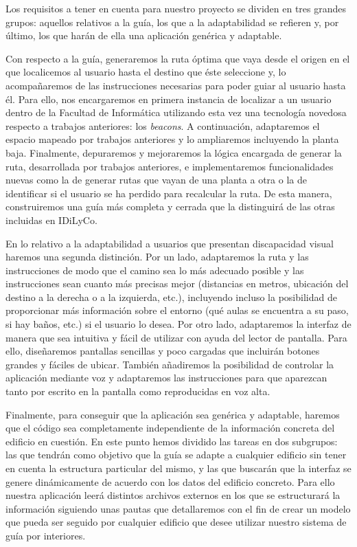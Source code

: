 Los requisitos a tener en cuenta para nuestro proyecto se dividen en tres grandes grupos: aquellos relativos a la guía, los que a la adaptabilidad se refieren y, por último, los que harán de ella una aplicación genérica y adaptable.

Con respecto a la guía, generaremos la ruta óptima que vaya desde el origen en el que localicemos al usuario hasta el destino que éste seleccione y, lo acompañaremos de las instrucciones necesarias para poder guiar al usuario hasta él. Para ello, nos encargaremos en primera instancia de localizar a un usuario dentro de la Facultad de Informática utilizando esta vez una tecnología novedosa respecto a trabajos anteriores: los \textit{beacons}. A continuación, adaptaremos el espacio mapeado por trabajos anteriores y lo ampliaremos incluyendo la planta baja. Finalmente, depuraremos y mejoraremos la lógica encargada de generar la ruta, desarrollada por trabajos anteriores, e implementaremos funcionalidades nuevas como la de generar rutas que vayan de una planta a otra o la de identificar si el usuario se ha perdido para recalcular la ruta. De esta manera, construiremos una guía más completa y cerrada que la distinguirá de las otras incluidas en IDiLyCo.

En lo relativo a la adaptabilidad a usuarios que presentan discapacidad visual haremos una segunda distinción. Por un lado, adaptaremos la ruta y las instrucciones de modo que el camino sea lo más adecuado posible y las instrucciones sean cuanto más precisas mejor (distancias en metros, ubicación del destino a la derecha o a la izquierda, etc.), incluyendo incluso la posibilidad de proporcionar más información sobre el entorno (qué aulas se encuentra a su paso, si hay baños, etc.) si el usuario lo desea. Por otro lado, adaptaremos la interfaz de manera que sea intuitiva y fácil de utilizar con ayuda del lector de pantalla. Para ello, diseñaremos pantallas sencillas y poco cargadas que incluirán botones grandes y fáciles de ubicar. También añadiremos la posibilidad de controlar la aplicación mediante voz y adaptaremos las instrucciones para que aparezcan tanto por escrito en la pantalla como reproducidas en voz alta.

Finalmente, para conseguir que la aplicación sea genérica y adaptable, haremos que el código sea completamente independiente de la información concreta del edificio en cuestión. En este punto hemos dividido las tareas en dos subgrupos: las que tendrán como objetivo que la guía se adapte a cualquier edificio sin tener en cuenta la estructura particular del mismo, y las que buscarán que la interfaz se genere dinámicamente de acuerdo con los datos del edificio concreto. Para ello nuestra aplicación leerá distintos archivos externos en los que se estructurará la información siguiendo unas pautas que detallaremos con el fin de crear un modelo que pueda ser seguido por cualquier edificio que desee utilizar nuestro sistema de guía por interiores.

